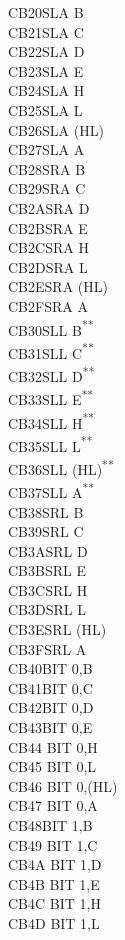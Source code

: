 \documentclass[12pt,twoside,openright,a4paper]{book}
\newcommand{\UNDOC}{\textnormal{\textsuperscript{**}}}
\begin{document}
\begin{multicols}{3}
{\begin{tabbing}
	CB20\>SLA B\\
	CB21\>SLA C\\
	CB22\>SLA D\\
	CB23\>SLA E\\
	CB24\>SLA H\\
	CB25\>SLA L\\
	CB26\>SLA (HL)\\
	CB27\>SLA A\\
	CB28\>SRA B\\
	CB29\>SRA C\\
	CB2A\>SRA D\\
	CB2B\>SRA E\\
	CB2C\>SRA H\\
	CB2D\>SRA L\\
	CB2E\>SRA (HL)\\
	CB2F\>SRA A\\
	CB30\>SLL B\UNDOC\\
	CB31\>SLL C\UNDOC\\
	CB32\>SLL D\UNDOC\\
	CB33\>SLL E\UNDOC\\
	CB34\>SLL H\UNDOC\\
	CB35\>SLL L\UNDOC\\
	CB36\>SLL (HL)\UNDOC\\
	CB37\>SLL A\UNDOC\\
	CB38\>SRL B\\
	CB39\>SRL C\\
	CB3A\>SRL D\\
	CB3B\>SRL E\\
	CB3C\>SRL H\\
	CB3D\>SRL L\\
	CB3E\>SRL (HL)\\
	CB3F\>SRL A\\
	CB40\>BIT 0,B\\
	CB41\>BIT 0,C\\
	CB42\>BIT 0,D\\
	CB43\>BIT 0,E\\
	CB44\> 	BIT 0,H\\
	CB45\> 	BIT 0,L\\
	CB46\> 	BIT 0,(HL)\\
	CB47\> 	BIT 0,A\\
	CB48\>BIT 1,B\\
	CB49\> 	BIT 1,C\\
	CB4A\> 	BIT 1,D\\
	CB4B\> 	BIT 1,E\\
	CB4C\> 	BIT 1,H\\
	CB4D\> 	BIT 1,L\\

\end{tabbing}}
\end{multicols}
\end{document}
